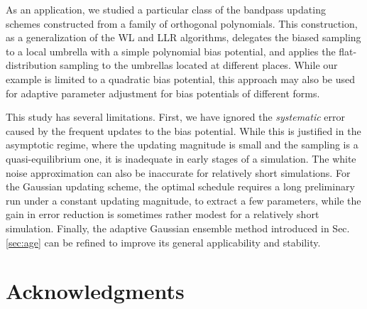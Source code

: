 \documentclass[preprint, superscriptaddress, floatfix]{revtex4-1}
\begin{document}
As an application,
we studied a particular class
of the bandpass updating schemes
constructed from a family of orthogonal polynomials.
%
This construction, 
as a generalization of
the WL and LLR\cite{langfeld2012, pellegrini2014} algorithms,
delegates the biased sampling to a local umbrella
with a simple polynomial bias potential,
and applies the flat-distribution sampling
to the umbrellas located at different places.
%
%
While our example is limited to a quadratic bias potential\cite{neuhaus2006, *neuhaus2007, zhu2012},
this approach may also be used for
adaptive parameter adjustment
for bias potentials of different
forms\cite{martin-mayor2007, *sergio2011, *persson2013, kim2010}.



This study has several limitations.
%
First, we have ignored the \emph{systematic}
error\cite{zhou2005, morozov2007, zhou2008}
caused by the frequent updates to the bias potential.
%
While this is justified in the asymptotic regime,
where the updating magnitude is small
and the sampling is a quasi-equilibrium one,\cite{
  zhou2005, morozov2007, zhou2008, barducci2008, dama2014}
it is inadequate in early stages of a simulation.
%
The white noise approximation
can also be inaccurate for relatively short simulations.
%
For the Gaussian updating scheme,
the optimal schedule requires
a long preliminary run under a constant updating magnitude,
to extract a few parameters,
while the gain in error reduction
is sometimes rather modest
for a relatively short simulation.
%
Finally, the adaptive Gaussian ensemble method
introduced in Sec. \ref{sec:age} can be refined
to improve its general applicability and stability.


\section{Acknowledgments}
\end{document}
